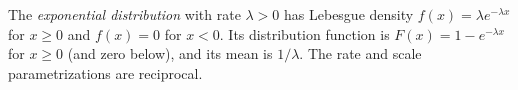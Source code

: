 
The \emph{exponential distribution} with rate $\lambda>0$ has Lebesgue density $f(x)=\lambda e^{-\lambda x}$ for $x\ge0$ and $f(x)=0$ for $x<0$. Its distribution function is $F(x)=1-e^{-\lambda x}$ for $x\ge0$ (and zero below), and its mean is $1/\lambda$. The rate and scale parametrizations are reciprocal.
